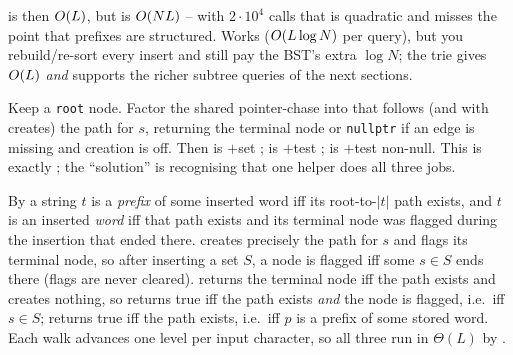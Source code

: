 \begin{thinkbox}
{ is then $O(L)$, but  is $O(N L)$ -- with $2\cdot 10^4$ calls
that is quadratic and misses the point that prefixes are structured.}
{Works ($O(L\log N)$ per query), but you rebuild/re-sort every insert and still pay the BST's extra
$\log N$; the trie gives $O(L)$ \emph{and} supports the richer subtree queries of the next sections.}
\end{thinkbox}

Keep a \texttt{root} node. Factor the shared pointer-chase into  that follows (and
with  creates) the path for $s$, returning the terminal node or \texttt{nullptr} if an edge is
missing and creation is off. Then  is $+$set ;  is
$+$test ;  is $+$test non-null. This is
exactly ; the ``solution'' is recognising that one helper does all three jobs.

\begin{proofbox}
By  a string $t$ is a \emph{prefix} of some inserted word iff its root-to-$|t|$ path
exists, and $t$ is an inserted \emph{word} iff that path exists and its terminal node was flagged during
the insertion that ended there.  creates precisely the path for $s$ and flags its terminal
node, so after inserting a set $S$, a node is flagged iff some $s\in S$ ends there (flags are never
cleared).  returns the terminal node iff the path exists and creates nothing, so
 returns true iff the path exists \emph{and} the node is flagged, i.e.\ iff $s\in S$;
 returns true iff the path exists, i.e.\ iff $p$ is a prefix of some stored word. Each
walk advances one level per input character, so all three run in $\Theta(L)$ by .
\end{proofbox}

